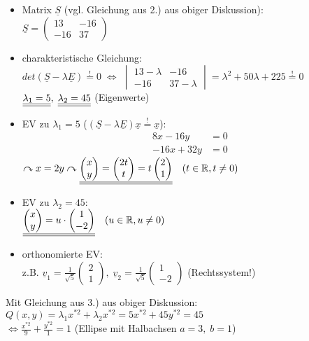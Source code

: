 \begin{itemize}
\item Matrix $\underline{S}$ (vgl. Gleichung aus 2.) aus obiger Diskussion):\\
$\underline{S}=\begin{pmatrix}
13 & -16\\
-16 & 37
\end{pmatrix}$
\item charakteristische Gleichung: \\
$det(\underline{S}-\lambda\underline{E})\overset{!}{=}0 \; \Leftrightarrow \; \begin{vmatrix}
13-\lambda & -16\\
-16 & 37-\lambda
\end{vmatrix}=\lambda^2+50\lambda+225\overset{!}{=}0$\\
$\underline{\underline{\lambda_1=5}}, \; \underline{\underline{\lambda_2 = 45}}$ (Eigenwerte)
\item EV zu $\lambda_1=5$ ($(\underline{S}-\lambda\underline{E})\underline{x}\overset{!}{=}\underline{x}$):
\begin{align*}
8x-16y &= 0\\
-16x+32y&=0
\end{align*}
$\curvearrowright x=2y \curvearrowright\underline{\underline{\begin{pmatrix}
x\\
y
\end{pmatrix}= \begin{pmatrix}
2t\\
t
\end{pmatrix}=t \begin{pmatrix}
2\\
1
\end{pmatrix}}} \quad (t \in \mathbb{R}, t\not = 0)$
\item EV zu $\lambda_2=45$:\\
$\underline{\underline{\begin{pmatrix}
x\\
y
\end{pmatrix}=u\cdot \begin{pmatrix}
1\\
-2
\end{pmatrix}}}\quad (u \in \mathbb{R}, u\not = 0)$
\item orthonomierte EV:\\
z.B. $\underline{v}_1=\frac{1}{\sqrt{5}}\begin{pmatrix}
2\\
1
\end{pmatrix}, \; \underline{v}_2=\frac{1}{\sqrt{5}}\begin{pmatrix}
1\\
-2
\end{pmatrix}$ (Rechtssystem!)
\end{itemize}
Mit Gleichung aus 3.) aus obiger Diskussion:\\
$Q(x,y)=\lambda_1x^{*2}+\lambda_2 x^{*2}=5x^{*2}+45y^{*2}=45$\\
$\Leftrightarrow \boxed{\frac{x^{*2}}{9}+\frac{y^{*2}}{1}=1}$ (Ellipse mit Halbachsen $a=3, \; b=1$)